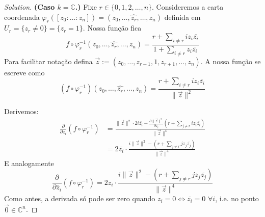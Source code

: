 \begin{proof}[Solution]
\textbf{(Caso \(k=\mathbb{C}\).)} Fixe \(r \in \{0,1,2,\ldots,n\}\). Consideremos a carta coordenada \(\varphi_r([z_0:\ldots:z_n])	= (z_0,\ldots,\widehat{z_r},\ldots,z_n)\) definida em \(U_r=\{z_r \neq 0\}=\{z_r=1\}\). Nossa função fica
	\[f \circ \varphi_r^{-1}(z_0,\ldots,\widehat{z_r},\ldots,z_n)=\frac{r+\sum_{i\neq r}iz_i\overline{z_i}}{1+\sum_{i\neq r}z_i\overline{z_i}}\]
Para facilitar notação defina \(\vec{z}:=(z_0,\ldots,z_{r-1},1,z_{r+1},\ldots,z_n)\). A nossa função se escreve como
\[(f \circ \varphi_r^{-1})(z_0,\ldots,\widehat{z_r},\ldots,z_n)=\frac{r+\sum_{i\neq r}iz_i\overline{z_i}}{\|\vec{z}\|^2}\]

Derivemos:
\begin{align*}
\frac{\partial }{\partial z_i}(f \circ \varphi_r^{-1})&=\frac{\|\vec{z}\|^2\cdot 2i\overline{z_i}-\frac{\partial \|\vec{z}\|^2}{\partial z_i}\left(r+\sum_{j \neq r}iz_i\overline{z_i}\right) }{\|\vec{z}\|^4}\\
&=2\overline{z_i}\cdot  \frac{i \|\vec{z}\|^2-\left(r+\sum_{j \neq r}jz_j\overline{z_j}\right) }{\|\vec{z}\|^4}
\end{align*}
E analogamente
\[\frac{\partial }{\partial \overline{z}_i}(f \circ \varphi_r^{-1})=2z_i\cdot  \frac{i \|\vec{z}\|^2-\left(r+\sum_{j \neq r}jz_j\overline{z_j}\right) }{\|\vec{z}\|^4}
\]
Como antes, a derivada só pode ser zero quando \(z_i=0 \iff \overline{z_i}=0\) \(\forall i\), i.e. no ponto \(\vec{0}\in \mathbb{C}^n\).


\end{proof}
